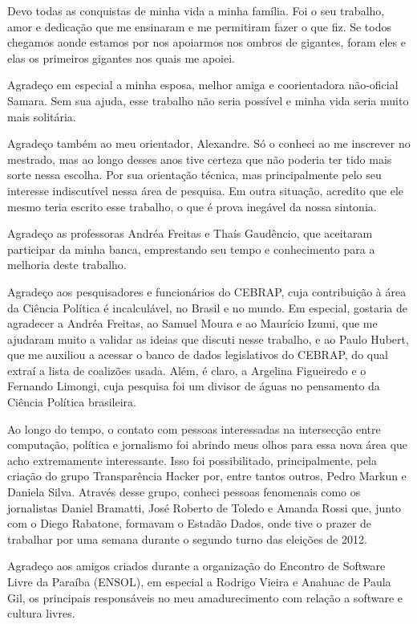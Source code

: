 Devo todas as conquistas de minha vida a minha família. Foi o seu
trabalho, amor e dedicação que me ensinaram e me permitiram fazer o que fiz. Se
todos chegamos aonde estamos por nos apoiarmos nos ombros de gigantes, foram
eles e elas os primeiros gigantes nos quais me apoiei.

Agradeço em especial a minha esposa, melhor amiga e coorientadora não-oficial
Samara. Sem sua ajuda, esse trabalho não seria possível e minha vida seria
muito mais solitária.

Agradeço também ao meu orientador, Alexandre. Só o conheci ao me inscrever no
mestrado, mas ao longo desses anos tive certeza que não poderia ter tido mais
sorte nessa escolha. Por sua orientação técnica, mas principalmente pelo seu
interesse indiscutível nessa área de pesquisa. Em outra situação, acredito que
ele mesmo teria escrito esse trabalho, o que é prova inegável da nossa
sintonia.

Agradeço as professoras Andréa Freitas e Thaís Gaudêncio, que aceitaram
participar da minha banca, emprestando seu tempo e conhecimento para a melhoria
deste trabalho.

Agradeço aos pesquisadores e funcionários do \gls{CEBRAP}, cuja contribuição à
área da Ciência Política é incalculável, no Brasil e no mundo. Em especial,
gostaria de agradecer a Andréa Freitas, ao Samuel Moura e ao Maurício Izumi, que 
me ajudaram muito a validar as ideias que discuti nesse trabalho, e ao Paulo
Hubert, que me auxiliou a acessar o banco de dados legislativos do
\gls{CEBRAP}, do qual extraí a lista de coalizões usada. Além, é claro, a
Argelina Figueiredo e o Fernando Limongi, cuja pesquisa foi um divisor de águas
no pensamento da Ciência Política brasileira.

Ao longo do tempo, o contato com pessoas interessadas na intersecção entre
computação, política e jornalismo foi abrindo meus olhos para essa nova área
que acho extremamente interessante. Isso foi possibilitado, principalmente,
pela criação do grupo Transparência Hacker por, entre tantos outros, Pedro
Markun e Daniela Silva. Através desse grupo, conheci pessoas fenomenais como os
jornalistas Daniel Bramatti, José Roberto de Toledo e Amanda Rossi que, junto
com o Diego Rabatone, formavam o Estadão Dados, onde tive o prazer de trabalhar
por uma semana durante o segundo turno das eleições de 2012.

Agradeço aos amigos criados durante a organização do Encontro de Software Livre
da Paraíba (ENSOL), em especial a Rodrigo Vieira e Anahuac de Paula Gil, os
principais responsáveis no meu amadurecimento com relação a software e cultura
livres.

